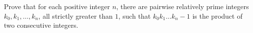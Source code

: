 Prove that for each positive integer $ n$,  there are pairwise relatively prime integers $ k_0,k_1,\ldots,k_n$,  all strictly greater than $ 1$,  such that $ k_0k_1\ldots k_n-1$ is the product of two consecutive integers.
